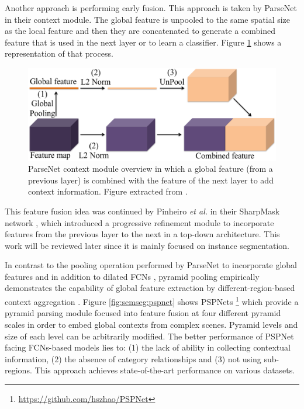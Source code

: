 Another approach is performing early fusion. This approach is taken by ParseNet\cite{Liu2015} in their context module. The global feature is unpooled to the same spatial size as the local feature and then they are concatenated to generate a combined feature that is used in the next layer or to learn a classifier. Figure \ref{fig:parsenet-module} shows a representation of that process.

\begin{figure}[!hbt]
	\centering
	\includegraphics[width=\linewidth]{Figures/Segmentation/parsenetmodule.eps}
	\caption{ParseNet context module overview in which a global feature (from a previous layer) is combined with the feature of the next layer to add context information. Figure extracted from \cite{Liu2015}.}
	\label{fig:parsenet-module}
\end{figure}

This feature fusion idea was continued by Pinheiro \emph{et al.} in their SharpMask network \cite{Pinheiro2016}, which introduced a progressive refinement module to incorporate features from the previous layer to the next in a top-down architecture. This work will be reviewed later since it is mainly focused on instance segmentation.

In contrast to the pooling operation performed by ParseNet to incorporate global features and in addition to dilated \acsp{FCN} \cite{Chen2014a}\cite{Yu2015}, pyramid pooling empirically demonstrates the capability of global feature extraction by different-region-based context aggregation \cite{Zhao2016}. Figure \ref{fig:semseg:pspnet} shows \acfp{PSPNet} \footnote{\url{https://github.com/hszhao/PSPNet}} which provide a pyramid parsing module focused into feature fusion at four different pyramid scales in order to embed global contexts from complex scenes. Pyramid levels and size of each level can be arbitrarily modified. The better performance of \acs{PSPNet} facing \acsp{FCN}-based models lies to: (1) the lack of ability in collecting contextual information, (2) the absence of category relationships and (3) not using sub-regions. This approach achieves state-of-the-art performance on various datasets. 

